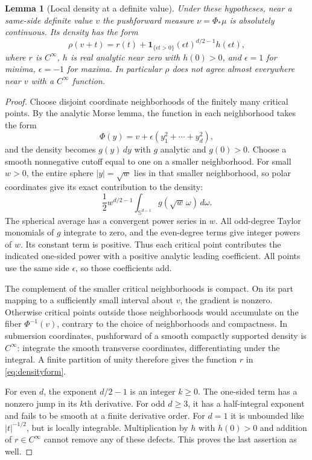 \documentclass[11pt,a4paper]{article}
\newtheorem{lemma}[theorem]{Lemma}
\theoremstyle{definition}\newtheorem{definition}[theorem]{Definition}
\theoremstyle{remark}\newtheorem{remark}[theorem]{Remark}
\begin{document}
\begin{lemma}[Local density at a definite value]\label{lem:density}
Under these hypotheses, near a same-side definite value $v$ the pushforward
measure $\nu=\Phi_*\mu$ is absolutely continuous. Its density has the form
\begin{equation}\label{eq:densityform}
 \rho(v+t)=r(t)+\mathbf1_{\{\epsilon t>0\}}
             (\epsilon t)^{d/2-1}h(\epsilon t),
\end{equation}
where $r$ is $C^\infty$, $h$ is real analytic near zero with $h(0)>0$, and
$\epsilon=1$ for minima, $\epsilon=-1$ for maxima. In particular $\rho$ does not
agree almost everywhere near $v$ with a $C^\infty$ function.
\end{lemma}
\begin{proof}
Choose disjoint coordinate neighborhoods of the finitely many critical points.
By the analytic Morse lemma, the function in each neighborhood takes the form
\[
 \Phi(y)=v+\epsilon(y_1^2+\cdots+y_d^2),
\]
and the density becomes $g(y)\,dy$ with $g$ analytic and $g(0)>0$.
Choose a smooth nonnegative cutoff equal to one on a smaller neighborhood.
For small $w>0$, the entire sphere $|y|=\sqrt w$ lies in that smaller
neighborhood, so polar coordinates give its exact contribution to the density:
\begin{equation}\label{eq:spherical}
 \frac12 w^{d/2-1}\int_{\mathbb S^{d-1}}g(\sqrt w\,\omega)\,d\omega.
\end{equation}
The spherical average has a convergent power series in $w$. All odd-degree
Taylor monomials of $g$ integrate to zero, and the even-degree terms give
integer powers of $w$. Its constant term is positive. Thus each critical point
contributes the indicated one-sided power with a positive analytic leading
coefficient. All points use the same side $\epsilon$, so those coefficients add.

The complement of the smaller critical neighborhoods is compact. On its part
mapping to a sufficiently small interval about $v$, the gradient is nonzero.
Otherwise critical points outside those neighborhoods would accumulate on the
fiber $\Phi^{-1}(v)$, contrary to the choice of neighborhoods and compactness.
In submersion coordinates, pushforward of a smooth compactly supported density
is $C^\infty$: integrate the smooth transverse coordinates, differentiating
under the integral. A finite partition of unity therefore gives the function
$r$ in \eqref{eq:densityform}.

For even $d$, the exponent $d/2-1$ is an integer $k\ge0$. The one-sided term
has a nonzero jump in its $k$th derivative. For odd $d\ge3$, it has a
half-integral exponent and fails to be smooth at a finite derivative order.
For $d=1$ it is unbounded like $|t|^{-1/2}$, but is locally integrable.
Multiplication by $h$ with $h(0)>0$ and addition of $r\in C^\infty$ cannot
remove any of these defects. This proves the last assertion as well.
\end{proof}
\end{document}
